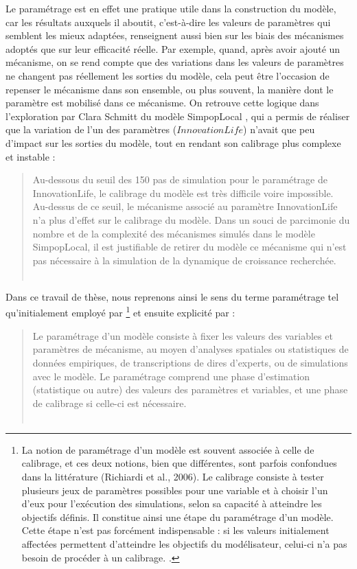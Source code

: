 Le paramétrage est en effet une pratique utile dans la construction du modèle, car les résultats auxquels il aboutit, c'est-à-dire les valeurs de paramètres qui semblent les mieux adaptées, renseignent aussi bien sur les biais des mécanismes adoptés que sur leur efficacité réelle.
Par exemple, quand, après avoir ajouté un mécanisme, on se rend compte que des variations dans les valeurs de paramètres ne changent pas réellement les sorties du modèle, cela peut être l'occasion de repenser le mécanisme dans son ensemble, ou plus souvent, la manière dont le paramètre est mobilisé dans ce mécanisme.
On retrouve cette logique dans l'exploration par Clara Schmitt du modèle SimpopLocal \autocite{schmitt_modelisation_2014}, qui a permis de réaliser que la variation de l'un des paramètres ($InnovationLife$) n'avait que peu d'impact sur les sorties du modèle, tout en rendant son calibrage plus complexe et instable :
\begin{quotation}
\noindent\og
	Au-dessous du seuil des 150 pas de simulation pour le paramétrage de InnovationLife, le calibrage du modèle est très difficile voire impossible.
	Au-dessus de ce seuil, le mécanisme associé au paramètre InnovationLife n'a plus d'effet sur le calibrage du modèle.
	Dans un souci de parcimonie du nombre et de la complexité des mécanismes simulés dans le modèle SimpopLocal, il est justifiable de retirer du modèle ce mécanisme qui n'est pas nécessaire à la simulation de la dynamique de croissance recherchée.
	\fg{}\\
	\mbox{}~ \hfill \textcite[224]{schmitt_modelisation_2014}
\end{quotation}


Dans ce travail de thèse, nous reprenons ainsi le sens du terme paramétrage tel qu'initialement employé par \textcite{hirtzel2015exploration}\footnote{
	\og
	La notion de paramétrage d'un modèle est souvent associée à celle de calibrage, et ces deux notions, bien que différentes, sont parfois confondues dans la littérature (Richiardi et al., 2006).
	Le calibrage consiste à tester plusieurs jeux de paramètres possibles pour une variable et à choisir l'un d'eux pour l'exécution des simulations, selon sa capacité à atteindre les objectifs définis.
	Il constitue ainsi une étape du paramétrage d'un modèle.
	Cette étape n'est pas forcément indispensable : si les valeurs initialement affectées permettent d'atteindre les objectifs du modélisateur, celui-ci n'a pas besoin de procéder à un calibrage.\fg{} \autocite[136]{hirtzel2015exploration}.
} et ensuite explicité par \textcite{tannier_analyse_2017} :
\begin{quotation}
\noindent \og 
Le paramétrage d'un modèle consiste à fixer les valeurs des variables et paramètres de mécanisme, au moyen d'analyses spatiales ou statistiques de données empiriques, de transcriptions de dires d'experts, ou de simulations avec le modèle.
Le paramétrage comprend une phase d'estimation (statistique ou autre) des valeurs des paramètres et variables, et une phase de calibrage si celle-ci est nécessaire.
\fg{}\\
\mbox{}~ \hfill \textcite[52]{tannier_analyse_2017}
\end{quotation}

